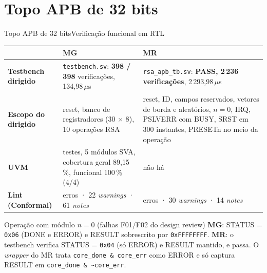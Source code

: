 \documentclass[aspectratio=169,10pt,t]{beamer}
\newcommand{\MG}{\textbf{\color{tmCafe}MG}}
\newcommand{\MR}{\textbf{\color{tmVermelho}MR}}
\begin{document}
\section{Topo APB de 32 bits}
\begin{frame}{Topo APB de 32 bits}{Verificação funcional em RTL}
  \footnotesize
  \renewcommand{\arraystretch}{1.2}
  \begin{tabularx}{\textwidth}{@{}>{\bfseries}p{2.6cm} >{\raggedright\arraybackslash}X >{\raggedright\arraybackslash}X@{}}
    \toprule
     & \MG & \MR \\
    \midrule
    Testbench dirigido & \texttt{testbench.sv}: \textbf{398 / 398} verificações, 134,98\,$\mu$s & \texttt{rsa\_apb\_tb.sv}: \textbf{PASS, 2\,236 verificações}, 2\,293,98\,$\mu$s \\
    Escopo do dirigido & reset, banco de registradores (30 $\times$ 8), 10 operações RSA & reset, ID, campos reservados, vetores de borda e aleatórios, $n = 0$, IRQ, PSLVERR com BUSY, SRST em 300 instantes, PRESETn no meio da operação \\
    UVM & 6 testes, 5 módulos SVA, cobertura geral 89,15\,\%, funcional 100\,\% (4/4) & não há \\
    Lint (Conformal) & 0 erros · 22 \emph{warnings} · 61 \emph{notes} & 0 erros · 30 \emph{warnings} · 14 \emph{notes} \\
    \bottomrule
  \end{tabularx}
  \vspace{0.2cm}
  \begin{alertblock}{Operação com módulo $n = 0$ (falhas F01/F02 do design review)}
    \scriptsize
    \MG: STATUS = \texttt{0x06} (DONE e ERROR) e RESULT sobrescrito por \texttt{0xFFFFFFFF}.\quad
    \MR: o testbench verifica STATUS = \texttt{0x04} (só ERROR) e RESULT mantido, e passa. O \emph{wrapper} do MR trata \texttt{core\_done \& core\_err} como ERROR e só captura RESULT em \texttt{core\_done \& \textasciitilde core\_err}.
  \end{alertblock}
\end{frame}

\end{document}

